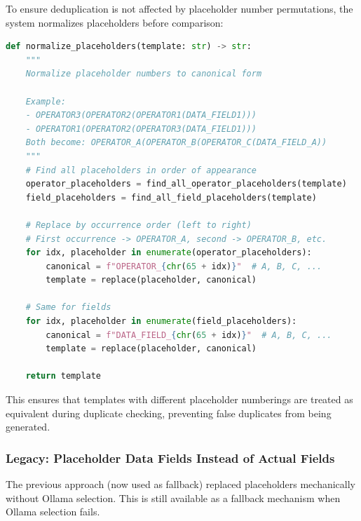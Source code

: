 To ensure deduplication is not affected by placeholder number permutations, the system normalizes placeholders before comparison:

\begin{lstlisting}[language=Python, caption=Placeholder Normalization]
def normalize_placeholders(template: str) -> str:
    """
    Normalize placeholder numbers to canonical form
    
    Example:
    - OPERATOR3(OPERATOR2(OPERATOR1(DATA_FIELD1))) 
    - OPERATOR1(OPERATOR2(OPERATOR3(DATA_FIELD1)))
    Both become: OPERATOR_A(OPERATOR_B(OPERATOR_C(DATA_FIELD_A))
    """
    # Find all placeholders in order of appearance
    operator_placeholders = find_all_operator_placeholders(template)
    field_placeholders = find_all_field_placeholders(template)
    
    # Replace by occurrence order (left to right)
    # First occurrence -> OPERATOR_A, second -> OPERATOR_B, etc.
    for idx, placeholder in enumerate(operator_placeholders):
        canonical = f"OPERATOR_{chr(65 + idx)}"  # A, B, C, ...
        template = replace(placeholder, canonical)
    
    # Same for fields
    for idx, placeholder in enumerate(field_placeholders):
        canonical = f"DATA_FIELD_{chr(65 + idx)}"  # A, B, C, ...
        template = replace(placeholder, canonical)
    
    return template
\end{lstlisting}

This ensures that templates with different placeholder numberings are treated as equivalent during duplicate checking, preventing false duplicates from being generated.

\subsubsection{Legacy: Placeholder Data Fields Instead of Actual Fields}

The previous approach (now used as fallback) replaced placeholders mechanically without Ollama selection. This is still available as a fallback mechanism when Ollama selection fails.

